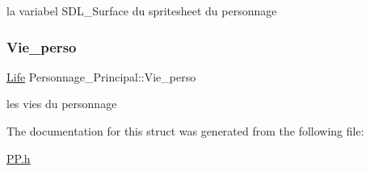 la variabel S\+D\+L\+\_\+\+Surface du spritesheet du personnage \mbox{\label{structPersonnage__Principal_a5d7356f35759733b870eab1f598bcd2e}} 
\subsubsection{\texorpdfstring{Vie\+\_\+perso}{Vie\_perso}}
{\footnotesize\ttfamily \hyperlink{structLife}{Life} Personnage\+\_\+\+Principal\+::\+Vie\+\_\+perso}

les vies du personnage 

The documentation for this struct was generated from the following file\+:\begin{DoxyCompactItemize}
\item 
\hyperlink{PP_8h}{P\+P.\+h}\end{DoxyCompactItemize}
